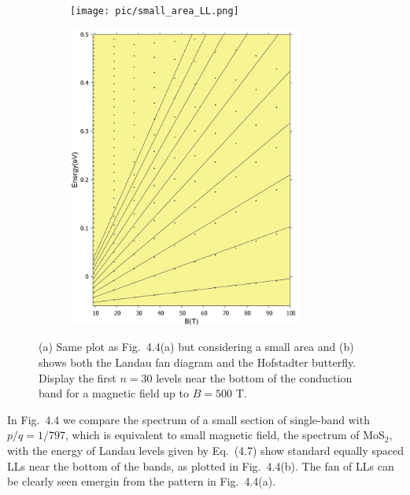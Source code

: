 \begin{figure}[htb]
\centering
\begin{subfigure}[b]{0.49\textwidth}
	\centering
	{\texttt{[image: pic/small\_area\_LL.png]}}
\end{subfigure}
\begin{subfigure}[b]{0.49\textwidth}
	\centering
	\includegraphics[width=0.85\textwidth,height=1.2\linewidth]{pic/landaulevel_h0_q_797.pdf}
\end{subfigure}
\caption[Landau levels in Hofstadter butterfly.]{
	(a) Same plot as Fig.~4.4(a) but considering a small area and (b) shows both the Landau fan diagram and the Hofstadter butterfly. Display the first $n = 30$ levels near the bottom of the conduction band for a magnetic field up to $B = 500$ T.
}
\end{figure}

In Fig.~4.4 we compare the spectrum of a small section of single-band with $p / q = 1 / 797$, which is equivalent to small magnetic field, the spectrum of MoS$_{2}$, with the energy of Landau levels given by Eq.~(4.7) show standard equally spaced \acp{LL} \cite{Shoenberg_1984,singleton2001band,blundell2001magnetism,kittel1987quantum} near the bottom of the bands, as plotted in Fig.~4.4(b). The fan of \acp{LL} can be clearly seen emergin from the pattern in Fig.~4.4(a).

